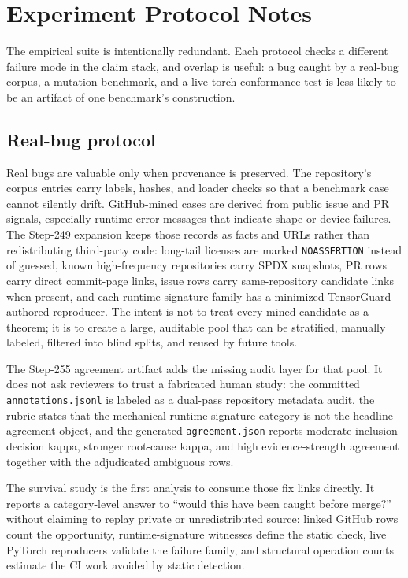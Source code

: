 \documentclass[11pt]{article}
\begin{document}
\section{Experiment Protocol Notes}

The empirical suite is intentionally redundant.  Each protocol checks a
different failure mode in the claim stack, and overlap is useful: a bug caught
by a real-bug corpus, a mutation benchmark, and a live torch conformance test is
less likely to be an artifact of one benchmark's construction.

\subsection{Real-bug protocol}

Real bugs are valuable only when provenance is preserved.  The repository's
corpus entries carry labels, hashes, and loader checks so that a benchmark case
cannot silently drift.  GitHub-mined cases are derived from public issue and PR
signals, especially runtime error messages that indicate shape or device
failures.  The Step-249 expansion keeps those records as facts and URLs rather
than redistributing third-party code: long-tail licenses are marked
\texttt{NOASSERTION} instead of guessed, known high-frequency repositories carry
SPDX snapshots, PR rows carry direct commit-page links, issue rows carry
same-repository candidate links when present, and each runtime-signature family
has a minimized TensorGuard-authored reproducer.  The intent is not to treat
every mined candidate as a theorem; it is to create a large, auditable pool that
can be stratified, manually labeled, filtered into blind splits, and reused by
future tools.

The Step-255 agreement artifact adds the missing audit layer for that pool.  It
does not ask reviewers to trust a fabricated human study: the committed
\texttt{annotations.jsonl} is labeled as a dual-pass repository metadata audit,
the rubric states that the mechanical runtime-signature category is not the
headline agreement object, and the generated \texttt{agreement.json} reports
moderate inclusion-decision kappa, stronger root-cause kappa, and high
evidence-strength agreement together with the adjudicated ambiguous rows.

The survival study is the first analysis to consume those fix links directly.
It reports a category-level answer to ``would this have been caught before
merge?'' without claiming to replay private or unredistributed source: linked
GitHub rows count the opportunity, runtime-signature witnesses define the static
check, live PyTorch reproducers validate the failure family, and structural
operation counts estimate the CI work avoided by static detection.
\end{document}
